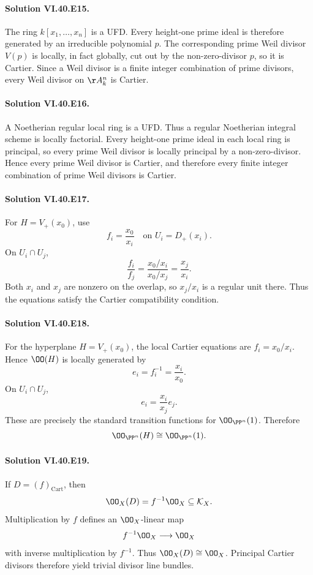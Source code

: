 \paragraph{Solution VI.40.E15.}
The ring \(k[x_1,\ldots,x_n]\) is a UFD.  Every height-one prime ideal is therefore generated by an irreducible polynomial \(p\).  The corresponding prime Weil divisor \(V(p)\) is locally, in fact globally, cut out by the non-zero-divisor \(p\), so it is Cartier.  Since a Weil divisor is a finite integer combination of prime divisors, every Weil divisor on \(\AA^n_k\) is Cartier.

\paragraph{Solution VI.40.E16.}
A Noetherian regular local ring is a UFD.  Thus a regular Noetherian integral scheme is locally factorial.  Every height-one prime ideal in each local ring is principal, so every prime Weil divisor is locally principal by a non-zero-divisor.  Hence every prime Weil divisor is Cartier, and therefore every finite integer combination of prime Weil divisors is Cartier.

\paragraph{Solution VI.40.E17.}
For \(H=V_+(x_0)\), use
\[
f_i=\frac{x_0}{x_i}\quad\text{on }U_i=D_+(x_i).
\]
On \(U_i\cap U_j\),
\[
\frac{f_i}{f_j}
=\frac{x_0/x_i}{x_0/x_j}
=\frac{x_j}{x_i}.
\]
Both \(x_i\) and \(x_j\) are nonzero on the overlap, so \(x_j/x_i\) is a regular unit there.  Thus the equations satisfy the Cartier compatibility condition.

\paragraph{Solution VI.40.E18.}
For the hyperplane \(H=V_+(x_0)\), the local Cartier equations are \(f_i=x_0/x_i\).  Hence \(\OO(H)\) is locally generated by
\[
e_i=f_i^{-1}=\frac{x_i}{x_0}.
\]
On \(U_i\cap U_j\),
\[
e_i=\frac{x_i}{x_j}e_j.
\]
These are precisely the standard transition functions for \(\OO_{\PP^n}(1)\).  Therefore
\[
\OO_{\PP^n}(H)\cong\OO_{\PP^n}(1).
\]

\paragraph{Solution VI.40.E19.}
If \(D=(f)_{\mathrm{Cart}}\), then
\[
\OO_X(D)=f^{-1}\OO_X\subseteq\KX.
\]
Multiplication by \(f\) defines an \(\OO_X\)-linear map
\[
f^{-1}\OO_X\longrightarrow\OO_X
\]
with inverse multiplication by \(f^{-1}\).  Thus \(\OO_X(D)\cong\OO_X\).  Principal Cartier divisors therefore yield trivial divisor line bundles.

